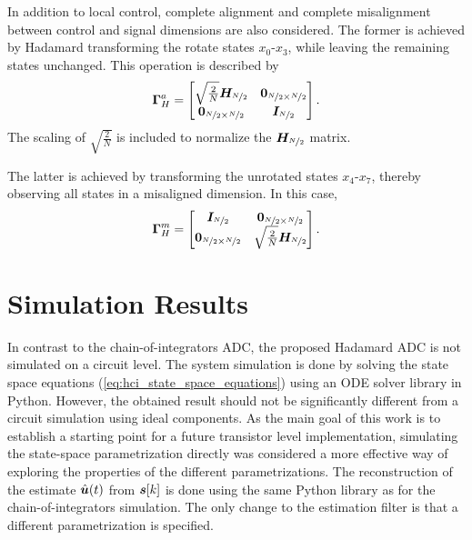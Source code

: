In addition to local control, complete alignment and complete misalignment between control and signal dimensions are also considered. The former is achieved by Hadamard transforming the rotate states $x_0$-$x_3$, while leaving the remaining states unchanged. This operation is described by
\begin{equation}
    \bm{\Gamma}_{H}^a =
    \begin{bmatrix}
        \sqrt{\frac{2}{N}}\bm{H_}{\nicefrac{N}{2}}    & \bm{0}_{\nicefrac{N}{2} \times \nicefrac{N}{2}} \\
        \bm{0}_{\nicefrac{N}{2} \times \nicefrac{N}{2}}  & \bm{I}_{\nicefrac{N}{2}}
    \end{bmatrix}.
\end{equation}
The scaling of $\sqrt{\frac{2}{N}}$ is included to normalize the $\bm{H_}{\nicefrac{N}{2}}$ matrix.

The latter is achieved by transforming the unrotated states $x_4$-$x_7$, thereby observing all states in a misaligned dimension. In this case,
\begin{equation}
    \bm{\Gamma}_{H}^m =
    \begin{bmatrix}
        \bm{I}_{\nicefrac{N}{2}}    & \bm{0}_{\nicefrac{N}{2} \times \nicefrac{N}{2}} \\
        \bm{0}_{\nicefrac{N}{2} \times \nicefrac{N}{2}}    & \sqrt{\frac{2}{N}}\bm{H_}{\nicefrac{N}{2}}
    \end{bmatrix}.
\end{equation}















\section{Simulation Results}
In contrast to the chain-of-integrators ADC, the proposed Hadamard ADC is not simulated on a circuit level. The system simulation is done by solving the state space equations (\ref{eq:hci_state_space_equations}) using an ODE solver library in Python. However, the obtained result should not be significantly different from a circuit simulation using ideal components. As the main goal of this work is to establish a starting point for a future transistor level implementation, simulating the state-space parametrization directly was considered a more effective way of exploring the properties of the different parametrizations. The reconstruction of the estimate $\hat{\bm{u}}(t)$ from $\bm{s}[k]$ is done using the same Python library as for the chain-of-integrators simulation. The only change to the estimation filter is that a different parametrization is specified.

